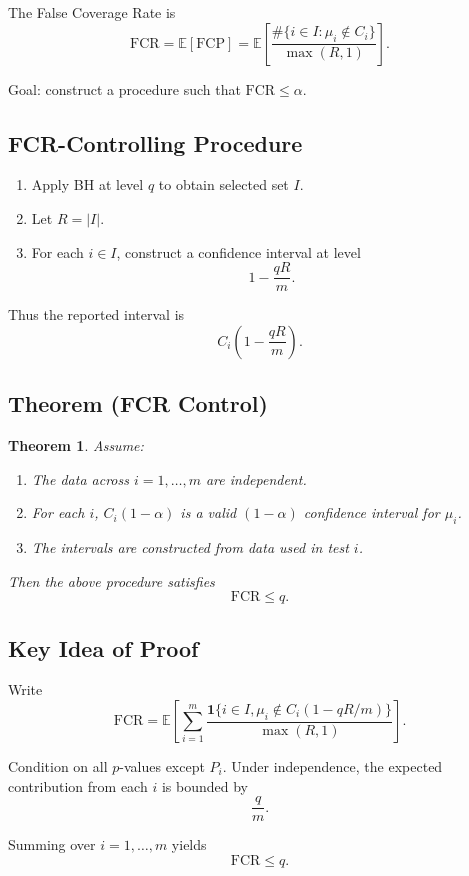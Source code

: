 \documentclass{article}
\newtheorem{theorem}{Theorem}
\begin{document}
The False Coverage Rate is
\[
\mathrm{FCR} = \mathbb{E}[\mathrm{FCP}]
=
\mathbb{E}\left[
\frac{\#\{ i \in I : \mu_i \notin C_i \}}{\max(R,1)}
\right].
\]

Goal: construct a procedure such that $\mathrm{FCR} \le \alpha$.

\subsection*{FCR-Controlling Procedure}

\begin{enumerate}
\item Apply BH at level $q$ to obtain selected set $I$.
\item Let $R = |I|$.
\item For each $i \in I$, construct a confidence interval at level
\[
1 - \frac{qR}{m}.
\]
\end{enumerate}

Thus the reported interval is
\[
C_i\left(1 - \frac{qR}{m}\right).
\]

\subsection*{Theorem (FCR Control)}

\begin{theorem}
Assume:
\begin{enumerate}
\item The data across $i=1,\dots,m$ are independent.
\item For each $i$, $C_i(1-\alpha)$ is a valid $(1-\alpha)$ confidence interval for $\mu_i$.
\item The intervals are constructed from data used in test $i$.
\end{enumerate}
Then the above procedure satisfies
\[
\mathrm{FCR} \le q.
\]
\end{theorem}

\subsection*{Key Idea of Proof}

Write
\[
\mathrm{FCR}
=
\mathbb{E}
\left[
\sum_{i=1}^m
\frac{\mathbf{1}\{ i \in I, \mu_i \notin C_i(1 - qR/m)\}}
{\max(R,1)}
\right].
\]

Condition on all $p$-values except $P_i$.
Under independence, the expected contribution from each $i$ is bounded by
\[
\frac{q}{m}.
\]

Summing over $i=1,\dots,m$ yields
\[
\mathrm{FCR} \le q.
\]
\end{document}
